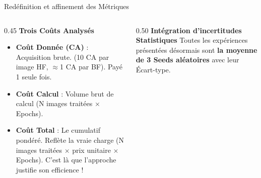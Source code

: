 \documentclass[aspectratio=169, 10pt]{beamer}
\begin{document}
\begin{frame}{Redéfinition et affinement des Métriques}
  \begin{columns}[T]
    \begin{column}{0.45\textwidth}
      \textbf{\color{primary}Trois Coûts Analysés}
      \begin{itemize}\footnotesize\setlength\itemsep{4pt}
        \item \textbf{Coût Donnée (CA)} : Acquisition brute. (10 CA par image HF, $\approx$1 CA par BF). Payé 1 seule fois.
        \item \textbf{Coût Calcul} : Volume brut de calcul (N images traitées $\times$ Epochs).
        \item \textbf{Coût Total} : Le cumulatif pondéré. Reflète la vraie charge (N images traitées $\times$ prix unitaire $\times$ Epochs). C'est là que l'approche justifie son efficience !
      \end{itemize}
    \end{column}
    
    \begin{column}{0.50\textwidth}
      \textbf{\color{primary}Intégration d'incertitudes Statistiques}
      Toutes les expériences présentées désormais sont \textbf{la moyenne de 3 Seeds aléatoires} avec leur Écart-type.
      
      \vspace{0.3cm}
    \end{column}
  \end{columns}
\end{frame}
\end{document}
